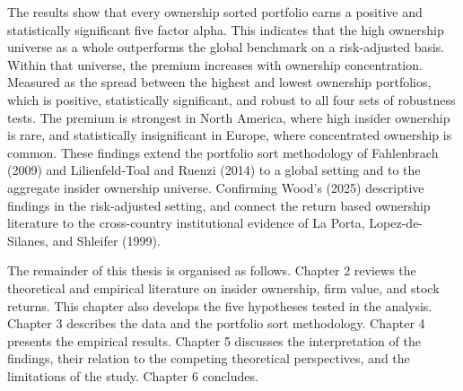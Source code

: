 The results show that every ownership sorted portfolio earns a positive and statistically significant five factor alpha. This indicates that the high ownership universe as a whole outperforms the global benchmark on a risk-adjusted basis. Within that universe, the premium increases with ownership concentration. Measured as the spread between the highest and lowest ownership portfolios, which  is positive, statistically significant, and robust to all four sets of robustness tests. The premium is strongest in North America, where high insider ownership is rare, and statistically insignificant in Europe, where concentrated ownership is common. These findings extend the portfolio sort methodology of Fahlenbrach (2009) and Lilienfeld-Toal and Ruenzi (2014) to a global setting and to the aggregate insider ownership universe. Confirming Wood's (2025) descriptive findings in the risk-adjusted setting, and connect the return based ownership literature to the cross-country institutional evidence of La Porta, Lopez-de-Silanes, and Shleifer (1999).

The remainder of this thesis is organised as follows. Chapter 2 reviews the theoretical and empirical literature on insider ownership, firm value, and stock returns. This chapter also develops the five hypotheses tested in the analysis. Chapter 3 describes the data and the portfolio sort methodology. Chapter 4 presents the empirical results. Chapter 5 discusses the interpretation of the findings, their relation to the competing theoretical perspectives, and the limitations of the study. Chapter 6 concludes.
